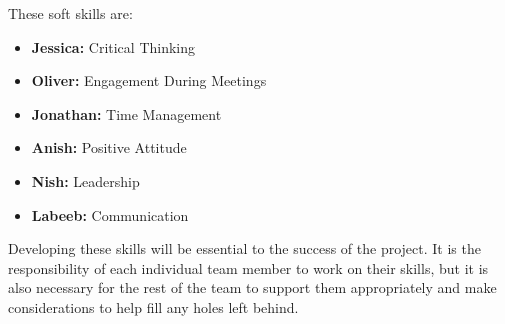 \documentclass[12pt, titlepage]{article}
\begin{document}
\begin{enumerate}
These soft skills are:
	\begin{itemize}
	\item \textbf{Jessica:} Critical Thinking
	\item \textbf{Oliver:} Engagement During Meetings
	\item \textbf{Jonathan:} Time Management
	\item \textbf{Anish:} Positive Attitude
	\item \textbf{Nish:} Leadership
	\item \textbf{Labeeb:} Communication
	\end{itemize}

Developing these skills will be essential to the success of the project. It is the responsibility of each individual team member to work on their skills, but it is also necessary for the rest of the team to support them appropriately and make considerations to help fill any holes left behind.
	

\end{enumerate}
\end{document}
